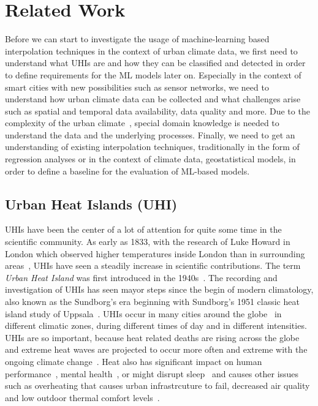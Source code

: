 \chapter{Related Work}
\label{chap:Related Work}

Before we can start to investigate the usage of machine-learning based interpolation techniques in the context of urban climate data, we first need to understand what UHIs are and how they can be classified and detected in order to define requirements for the ML models later on. Especially in the context of smart cities with new possibilities such as sensor networks, we need to understand how urban climate data can be collected and what challenges arise such as spatial and temporal data availability, data quality and more. Due to the complexity of the urban climate~\cite{oke2006guideline}, special domain knowledge is needed to understand the data and the underlying processes.
Finally, we need to get an understanding of existing interpolation techniques, traditionally in the form of regression analyses or in the context of climate data, geostatistical models, in order to define a baseline for the evaluation of ML-based models.

\section{Urban Heat Islands (UHI)}

UHIs have been the center of a lot of attention for quite some time in the scientific community. As early as 1833, with the research of Luke Howard in London which observed higher temperatures inside London than in surrounding areas~\cite{howard1833climate}, UHIs have seen a steadily increase in scientific contributions. The term \textit{Urban Heat Island} was first introduced in the 1940s~\cite{balchin1947micro}. The recording and investigation of UHIs has seen mayor steps since the begin of modern climatology, also known as the Sundborg's era beginning with Sundborg's 1951 classic heat island study of Uppsala~\cite{sundborg1951climatological}. UHIs occur in many cities around the globe~\cite{peng2012surface} in different climatic zones, during different times of day and in different intensities.\\
UHIs are so important, because heat related deaths are rising across the globe~\cite{kovats2008heat} and extreme heat waves are projected to occur more often and extreme with the ongoing climate change~\cite{lorenz2019detection}. Heat also has significant impact on human performance~\cite{kjellstrom2016heat}, mental health~\cite{obradovich2018empirical}, or might disrupt sleep~\cite{obradovich2017nighttime} and causes other issues such as overheating that causes urban infrastrcuture to fail, decreased air quality and low outdoor thermal comfort levels~\cite{stone2013climate}.

